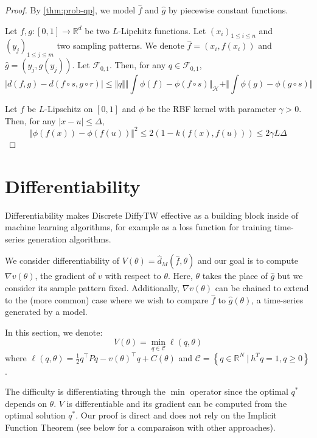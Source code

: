 \begin{proof}
By \cref{thm:prob-qp}, we model $\hat f$ and $\hat g$ by piecewise constant functions.

Let $f,g:[0,1] \to \mathbb R^d$ be two $L$-Lipchitz functions. Let $(x_i)_{1\leq i \leq n}$ and $(y_j)_{1\leq j\leq m}$ two sampling patterns. We denote $\hat f = (x_i, f(x_i))$ and $\hat g = (y_j, g(y_j))$.
Let $\mathcal F_{0,1}$. Then, for any $q\in\mathcal F_{0,1}$,
    \begin{equation}
        \vert d(f, g) - d(f\circ s, g\circ r) \vert \leq \Vert q \Vert \Vert \int \phi(f) - \phi(f\circ s)\Vert_{\mathcal H} + \Vert \int \phi(g)- \phi(g\circ s)\Vert
    \end{equation}


Let $f$ be $L$-Lipschitz on $[0,1]$ and $\phi$ be the RBF kernel with parameter $\gamma > 0$.
Then, for any $\vert x - u \vert \leq \Delta$,
\begin{equation}
    \Vert \phi(f(x)) - \phi(f(u)) \Vert^2 \leq 2\left(1 - k(f(x), f(u))\right) \leq 2 \gamma L \Delta
\end{equation}
\end{proof}

\section{Differentiability}
Differentiability makes Discrete DiffyTW effective as a building block inside of machine learning algorithms, for example as a loss function for training time-series generation algorithms.

We consider differentiability of $V(\theta) = \hat d_M(\hat f, \theta)$ and our goal is to compute $\nabla v(\theta)$, the gradient of $v$ with respect to $\theta$. Here, $\theta$ takes the place of $\hat g$ but we consider its sample pattern fixed. Additionally, $\nabla v(\theta)$ can be chained to extend to the (more common) case where we wish to compare $\hat f$ to $\hat g(\theta)$, a time-series generated by a model.

In this section, we denote:
\begin{equation}\label{prob:fullqp}
    V(\theta) = \min_{q\in\mathcal C} \ell(q, \theta)
\end{equation}
where $\ell(q, \theta) = \frac{1}{2} q^\top Pq - v(\theta)^\top q + C(\theta)$ and $\mathcal C = \left\lbrace q\in\mathbb R^N ~\vert~ h^Tq=1, q \geq 0\right\rbrace$.

The difficulty is differentiating through the $\min$ operator since the optimal $q^*$ depends on $\theta$. $V$ is differentiable and its gradient can be computed from the optimal solution $q^*$. Our proof is direct and does not rely on the Implicit Function Theorem (see below for a comparaison with other approaches).

